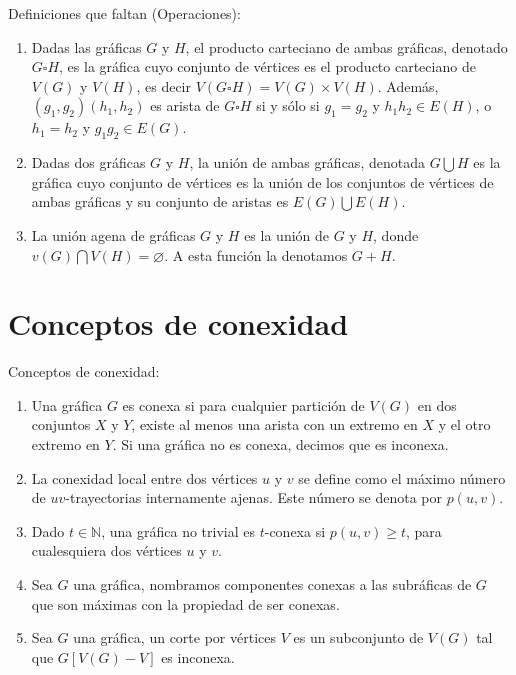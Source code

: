     \begin{definicion} Definiciones que faltan (Operaciones):
    \begin{enumerate}
        \item Dadas las gr\'aficas $G$ y $H$, el producto carteciano de ambas
        gr\'aficas, denotado $G \square H$, es la gr\'afica cuyo conjunto de
        v\'ertices es el producto carteciano de $V(G)$ y $V(H)$, es decir $V(G
        \square H) = V(G) \times V(H)$. Adem\'as, $(g_1,g_2)(h_1,h_2)$ es arista
        de $G \square H$ si y s\'olo si $g_1 = g_2$ y $h_1h_2 \in E(H)$, o $h_1
        = h_2$ y $g_1g_2 \in E(G)$.
        \item Dadas dos gr\'aficas $G$ y $H$, la uni\'on de ambas gr\'aficas,
        denotada $G \bigcup H$ es la gr\'afica cuyo conjunto de v\'ertices es la
        uni\'on de los conjuntos de v\'ertices de ambas gr\'aficas y su conjunto
        de aristas es $E(G) \bigcup E(H)$. 
        \item La uni\'on agena de gr\'aficas $G$ y $H$ es la uni\'on de $G$ y
        $H$, donde $v(G) \bigcap V(H) = \varnothing$. A esta funci\'on la
        denotamos $G + H$. 
    \end{enumerate}
\end{definicion}

\section{Conceptos de conexidad}
\label{sec:conexidad}

\begin{definicion} Conceptos de conexidad:
    \label{def:conexidad}
    \begin{enumerate}    
        \item Una gr\'afica $G$ es conexa si para cualquier partici\'on de
        $V(G)$ en dos conjuntos $X$ y $Y$, existe al menos una arista con un
        extremo en $X$ y el otro extremo en $Y$. Si una gr\'afica no es conexa,
        decimos que es inconexa.
        \item La conexidad local entre dos v\'ertices $u$ y $v$ se define como
        el m\'aximo n\'umero de $uv$-trayectorias internamente ajenas. Este
        n\'umero se denota por $p(u,v)$.
        \item Dado $t \in \mathbb{N}$, una gr\'afica no trivial es $t$-conexa si
        $p(u,v) \geq t$, para cualesquiera dos v\'ertices $u$ y $v$. 
        \item Sea $G$ una gr\'afica, nombramos componentes conexas a las
        subr\'aficas de $G$ que son m\'aximas con la propiedad de ser conexas.
        \item Sea $G$ una gr\'afica, un corte por v\'ertices $V$ es un
        subconjunto de $V(G)$ tal que $G[V(G)-V]$ es inconexa.
    \end{enumerate}
\end{definicion}

